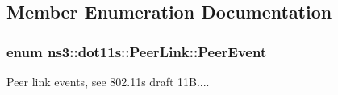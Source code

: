 \subsection{Member Enumeration Documentation}
\subsubsection[{\texorpdfstring{Peer\+Event}{PeerEvent}}]{\setlength{\rightskip}{0pt plus 5cm}enum {\bf ns3\+::dot11s\+::\+Peer\+Link\+::\+Peer\+Event}\hspace{0.3cm}{\ttfamily [private]}}\hypertarget{classns3_1_1dot11s_1_1PeerLink_ac43c14ad12c9ea15604be0ee70ab6b90}{}\label{classns3_1_1dot11s_1_1PeerLink_ac43c14ad12c9ea15604be0ee70ab6b90}


Peer link events, see 802.\+11s draft 11\+B.... 


